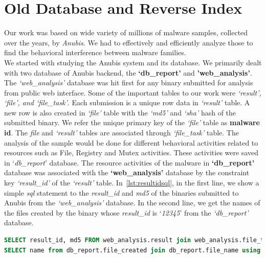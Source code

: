 \section{Old Database and Reverse Index}
\label{sec:Old Database and Reverse Index}
Our work was based on wide variety of millions of malware samples, collected over the years, by \emph{Anubis}.
We had to effectively and efficiently analyze those to find the behavioral interference between malware families.\\
We started with studying the Anubis system and its database.
We primarily dealt with two database of Anubis backend, the \textbf{`db\_report'} and \textbf{'web\_analysis'}.
The \emph{`web\_analysis'} database was hit first for any binary submitted for analysis from public web interface.
Some of the important tables to our work were \emph{`result', `file', and `file\_task'}.
Each submission is a unique row data in \emph{`result'} table.
A new row is also created in \emph{`file'} table with the \emph{`md5'} and \emph{`sha'} hash of the submitted binary.
We refer the unique primary key of the \emph{`file'} table as \textbf{malware id}.
The \emph{file} and \emph{`result'} tables are associated through \emph{`file\_task'} table.
The analysis of the sample would be done for different behavioral activities related to resources such as File, Registry and Mutex activities.
These activities were saved in `\emph{db\_report}' database.
The resource activities of the malware in \textbf{`db\_report'} database was associated with the \textbf{`web\_analysis'} database by the constraint key \textit{`result\_id'} of the \emph{`result'} table.
In~\autoref{lst:resultidsql}, in the first line, we show a simple \emph{sql} statement to the \emph{result\_id} and \emph{md5} of the binaries submitted to Anubis from the \emph{`web\_analysis'} database.
In the second line, we get the names of the files created by the binary whose \emph{result\_id} is `\emph{12345}' from the \emph{`db\_report'} database.\\
\begin{lstlisting}[language=sql,caption={sql showing database structure to get file created activities of a malware sample},label={lst:resultidsql}]
SELECT result_id, md5 FROM web_analysis.result join web_analysis.file_task using (task_id) join web_analysis.file using (file_id) WHERE task_id = result_id;
SELECT name from db_report.file_created join db_report.file_name using (file_name_id) where result_id = '12345';
\end{lstlisting}


